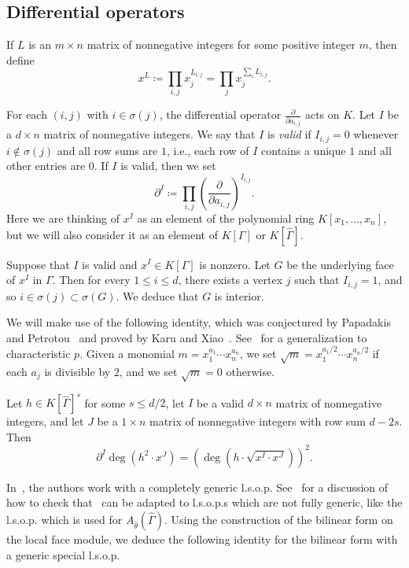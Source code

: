\subsection{Differential operators}

If $L$ is an $m \times n$ matrix of nonnegative integers for some positive integer $m$, then define 
\[ x^L \coloneqq \prod_{i,j} x_j^{L_{i,j}} = \prod_j x_j^{\sum_i L_{i,j}}.\] 

For each $(i, j)$ with $i \in \sigma(j)$, 
the differential operator $\frac{\partial}{\partial a_{i,j}}$ acts on $K$. 
Let $I$ be a $d \times n$ matrix of nonnegative integers. We say that $I$ is \emph{valid} if $I_{i,j} = 0$ whenever $i \not \in \sigma(j)$ and 
all row sums are $1$, i.e.,
each row of $I$ contains a unique $1$ and all other entries are $0$. If $I$ is valid, then we set
$$\partial^I \coloneqq \prod_{i,j} \left(\frac{\partial}{\partial a_{i,j}}\right)^{I_{i,j}}.$$
Here we are thinking of $x^I$ as an element of the polynomial ring $K[x_1, \dotsc, x_n]$, but we will also consider it as an element of $K[\Gamma]$ or $K[\hat{\Gamma}]$. 

\begin{rema}\label{rem:validunderlyingsupport}
	Suppose that $I$ is valid and $x^I \in K[\Gamma]$ is nonzero. Let $G$  be the underlying face of $x^I$ in $\Gamma$. Then for every $1 \le i \le d$, there exists a vertex $j$ such that $I_{i,j} = 1$, and so $i \in \sigma(j) \subset \sigma(G)$. We deduce that $G$ is interior. 
\end{rema}

We will make use of the following identity, which was conjectured by Papadakis and Petrotou~\cite{PapadakisPetrotoug} and proved by Karu and Xiao~\cite{KaruXiao}. See~\cite[Corollary~3.1]{KLS} for a generalization to characteristic $p$. 
Given a monomial $m = x_1^{a_1} \dotsb x_n^{a_n}$, we 
set $\sqrt{m} = x_1^{a_1/2} \dotsb x_n^{a_n/2}$ if each $a_j$ is divisible by $2$, and we set $\sqrt{m} = 0$ otherwise.

\begin{prop}\label{prop:KXidentity}
Let $h \in K[\hat{\Gamma}]^{s}$ for some $s \le d/2$, 
let $I$ be a valid $d \times n$ matrix of nonnegative integers, and   let $J$ be a $1 \times n$  matrix of nonnegative integers  with row sum $d - 2s$.
Then
$$\partial^I \deg(h^2 \cdot x^J) =  (\deg (h\cdot \sqrt{x^I \cdot x^J}))^2.$$
\end{prop}

In~\cite{KaruXiao}, the authors work with a completely generic l.s.o.p. See~\cite[Corollary 2.10]{LNS} for a discussion of how to check that~\cite[Corollary 4.2]{KaruXiao} can be adapted to l.s.o.p.s which are not fully generic, like the l.s.o.p. which is used for $A_{\hat{\theta}}(\hat{\Gamma})$.  
Using the construction of the bilinear form on the local face module, we deduce the following identity for the bilinear form with a generic special l.s.o.p. 

